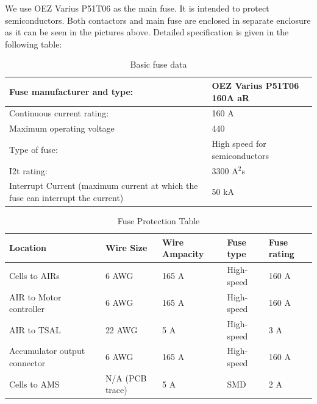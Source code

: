 We use OEZ Varius P51T06 as the main fuse. It is intended to protect semiconductors. Both contactors and main fuse are enclosed in separate enclosure as it can be seen in the pictures above. Detailed specification is given in the following table:

\begin{table}[H]
	\centering
	\caption{Basic fuse data}
	\begin{tabu}{|X|X|}
		\hline
		Fuse manufacturer and type: & OEZ Varius P51T06 160A aR \\
		\hline
		Continuous current rating:  & 160 A \\
		\hline
		Maximum operating voltage  & 440 \vdc \\
		\hline
		Type of fuse: & High speed for semiconductors \\
		\hline
		I2t rating: & 3300 A$^{2}$s \\
		\hline
		Interrupt Current (maximum current at which the fuse can interrupt the current) & 50 kA \\
		\hline
	\end{tabu}%
	\label{tab:acc-fuse}%
\end{table}%



\begin{table}[H]
	\centering
	\caption{Fuse Protection Table}
	\begin{tabu}{|X|X|X|X|X|}
		\hline
		Location & Wire Size & Wire Ampacity & Fuse type & Fuse rating\\
		\hline
		Cells to AIRs & 6 AWG & 165 A & High-speed & 160 A \\
		\hline
		AIR to Motor controller & 6 AWG & 165 A & High-speed & 160 A \\
		\hline
		AIR to TSAL & 22 AWG & 5 A & High-speed & 3 A \\
		\hline
		Accumulator output connector & 6 AWG & 165 A & High-speed  & 160 A \\
		\hline
		Cells to AMS & N/A (PCB trace) & 5 A    & SMD    & 2 A \\
		\hline
	\end{tabu}%
	\label{tab:acc-fuse-protection}%
\end{table}%

